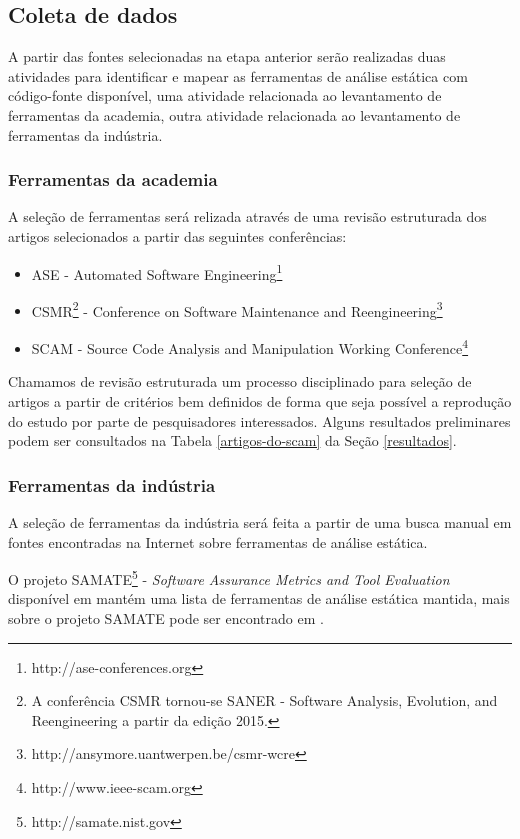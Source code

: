 \documentclass[12pt]{article}
\begin{document}
\subsection{Coleta de dados}

A partir das fontes selecionadas na etapa anterior serão realizadas duas
atividades para identificar e mapear as ferramentas de análise estática com
código-fonte disponível, uma atividade relacionada ao levantamento de
ferramentas da academia, outra atividade relacionada ao levantamento de
ferramentas da indústria.

\subsubsection{Ferramentas da academia}

A seleção de ferramentas será relizada através de uma revisão estruturada dos
artigos selecionados a partir das seguintes conferências:

\begin{itemize}
  \item ASE - Automated Software
    Engineering\footnote{http://ase-conferences.org}
  \item CSMR\footnote{A conferência CSMR tornou-se SANER - Software Analysis,
    Evolution, and Reengineering a partir da edição 2015.} - Conference on
    Software Maintenance and
    Reengineering\footnote{http://ansymore.uantwerpen.be/csmr-wcre}
  \item SCAM - Source Code Analysis and Manipulation Working
    Conference\footnote{http://www.ieee-scam.org}
\end{itemize}

Chamamos de revisão estruturada um processo disciplinado para seleção de
artigos a partir de critérios bem definidos de forma que seja possível a
reprodução do estudo por parte de pesquisadores interessados. Alguns
resultados preliminares podem ser consultados na Tabela \ref{artigos-do-scam}
da Seção \ref{resultados}.

\subsubsection{Ferramentas da indústria}

A seleção de ferramentas da indústria será feita a partir de uma busca manual
em fontes encontradas na Internet sobre ferramentas de análise estática.

O projeto SAMATE\footnote{
http://samate.nist.gov} - {\em Software Assurance Metrics and Tool Evaluation}
disponível em  mantém uma lista de
ferramentas de análise estática mantida, mais sobre o projeto SAMATE pode
ser encontrado em .
\end{document}
